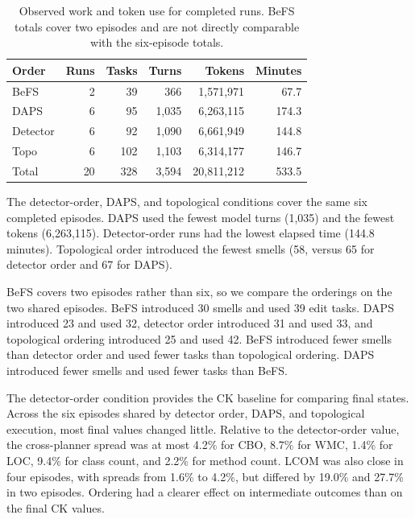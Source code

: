 \documentclass[conference]{IEEEtran}
\begin{document}
\begin{table}[tb]
\centering
\footnotesize
\setlength{\tabcolsep}{4.0pt}
\begin{tabular}{@{}lrrrrr@{}}
\toprule
Order & Runs & Tasks & Turns & Tokens & Minutes \\
\midrule
BeFS   & 2 & 39  & 366   & 1,571,971 & 67.7 \\
DAPS   & 6 & 95  & 1,035 & 6,263,115 & 174.3 \\
Detector & 6 & 92  & 1,090 & 6,661,949 & 144.8 \\
Topo   & 6 & 102 & 1,103 & 6,314,177 & 146.7 \\
\midrule
Total  & 20 & 328 & 3,594 & 20,811,212 & 533.5 \\
\bottomrule
\end{tabular}
\caption{Observed work and token use for completed runs. BeFS totals
cover two episodes and are not directly comparable with the six-episode
totals.}
\label{tab:overhead}
\end{table}

The detector-order, DAPS, and topological conditions cover the same six completed
episodes. DAPS used the fewest model turns (1,035) and the fewest tokens
(6,263,115). Detector-order runs had the lowest elapsed time (144.8 minutes).
Topological order introduced the fewest smells (58, versus 65 for detector
order and 67 for DAPS).

BeFS covers two episodes rather than six, so we compare the orderings on the two
shared episodes. BeFS introduced 30 smells and used 39 edit tasks. DAPS
introduced 23 and used 32, detector order introduced 31 and used 33, and
topological ordering introduced 25 and used 42. BeFS introduced fewer smells
than detector order and used fewer tasks than topological ordering. DAPS
introduced fewer smells and used fewer tasks than BeFS.

The detector-order condition provides the CK baseline for comparing final
states. Across the six episodes shared by detector order, DAPS, and topological
execution, most final values changed little. Relative to the detector-order
value, the cross-planner spread was at most 4.2\% for CBO, 8.7\% for WMC, 1.4\% for LOC,
9.4\% for class count, and 2.2\% for method count. LCOM was also close in four
episodes, with spreads from 1.6\% to 4.2\%, but differed by 19.0\% and 27.7\%
in two episodes. Ordering had a clearer effect on intermediate outcomes than on
the final CK values.

\end{document}
